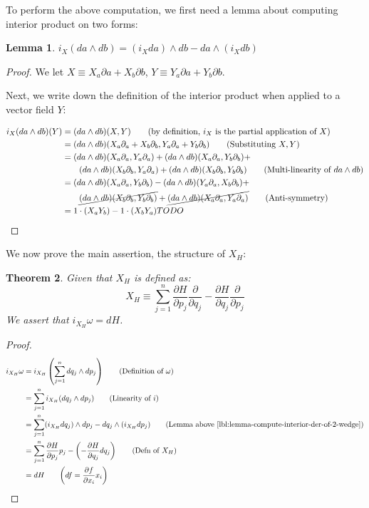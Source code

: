\documentclass[11pt]{book}
\newtheorem{theorem}{Theorem}
\newtheorem{lemma}[theorem]{Lemma}
\newtheorem{proof}[theorem]{Proof}
\begin{document}
To perform the above computation, we first need a lemma about computing
interior product on two forms:
\begin{lemma}\label{lbl:lemma-compute-interior-der-of-2-wedge}
        $i_X(da \wedge db) = (i_X da) \wedge db - da \wedge (i_X db)$
\end{lemma}
\begin{proof}
We let $X \equiv X_a \partial a + X_b \partial b$, 
$Y \equiv Y_a \partial a + Y_b \partial b$.

Next, we write down the definition of the interior product when
applied to a vector field $Y$:

\begin{align*}
i_X(da \wedge db)(Y) &= (da \wedge db) (X, Y) \qquad \text{(by definition, $i_X$ is the partial application of $X$)} \\
&= (da \wedge db) (X_a \partial_a + X_b \partial_b, Y_a \partial_a + Y_b \partial_b) \qquad \text{(Substituting $X, Y$)} \\
&= (da \wedge db) (X_a \partial_a, Y_a \partial_a) +  
   (da \wedge db) (X_a \partial_a, Y_b \partial_b) + \\
&\qquad (da \wedge db) (X_b \partial_b, Y_a \partial_a) +  
(da \wedge db) (X_b \partial_b, Y_b \partial_b) \qquad \text{(Multi-linearity of $da \wedge db$)} \\
&=  (da \wedge db) (X_a \partial_a, Y_b \partial_b)
   - (da \wedge db) (Y_a \partial_a, X_b \partial_b) +   \\
& \qquad \cancel{(da \wedge db) (X_b \partial_b, Y_b \partial_b)} +
        \cancel{(da \wedge db) (X_a \partial_a, Y_a \partial_a)} \qquad \text{(Anti-symmetry)} \\
&=  1 \cdot (X_a Y_b) - 1 \cdot (X_b Y_a)
TODO
\end{align*}
\end{proof}

We now prove the main assertion, the structure of $X_H$:

\begin{theorem}
Given that $X_H$ is defined as:
$$
X_H \equiv \sum_{j=1}^n
\frac{\partial H}{\partial p_j} \frac{\partial}{\partial q_j} - 
\frac{\partial H}{\partial q_j}\frac{\partial}{\partial p_j}
$$
We assert that  $i_{X_H} \omega = dH$.
\end{theorem}
\begin{proof}
\begin{align*}
        i_{X_H} \omega &= i_{X_H} \left( \sum_{j=1}^n dq_j \wedge dp_j \right) \qquad \text{(Definition of $\omega$)} \\
&= \sum_{j=1}^n i_{X_H} (dq_j \wedge dp_j) \qquad \text{(Linearity of $i$)} \\
&= \sum_{j=1}^n (i_{X_H} dq_j) \wedge dp_j - dq_j \wedge (i_{X_H} dp_j) \qquad \text{(Lemma above \ref{lbl:lemma-compute-interior-der-of-2-wedge})} \\
&= \sum_{j=1}^n \frac{\partial H}{\partial p_j} p_j - \left( - \frac{\partial H}{\partial q_j}dq_j \right) \qquad \text{(Defn of $X_H$)} \\
&= dH \qquad \text{$\left(df = \frac{\partial f}{\partial x_i}x_i\right)$}
\end{align*}
\end{proof}
\end{document}
